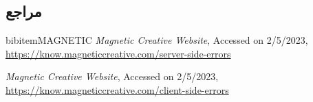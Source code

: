 {\subsection*{مراجع}

\begin{latin}
	\begingroup
	\renewcommand{\section}[2]{}%
	
\begin{thebibliography}{9}

	bibitem{MAGNETIC}
	\textit{Magnetic Creative Website},
        Accessed on 2/5/2023,
        \url{https://know.magneticcreative.com/server-side-errors}	

	\textit{Magnetic Creative Website},
	Accessed on 2/5/2023,
	\url{https://know.magneticcreative.com/client-side-errors}

\end{thebibliography}
\endgroup
\end{latin}

}
